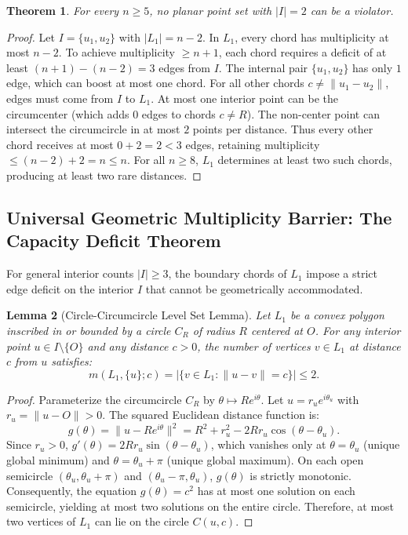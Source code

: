 \documentclass[11pt,reqno]{article}
\newtheorem{theorem}{Theorem}
\newtheorem{lemma}[theorem]{Lemma}
\theoremstyle{definition}
\begin{document}
\begin{theorem}\label{thm:two_interior}
For every $n \ge 5$, no planar point set with $|I| = 2$ can be a violator.
\end{theorem}
\begin{proof}
Let $I = \{u_1, u_2\}$ with $|L_1| = n - 2$. In $L_1$, every chord has multiplicity at most $n - 2$. To achieve multiplicity $\ge n + 1$, each chord requires a deficit of at least $(n + 1) - (n - 2) = 3$ edges from $I$.
The internal pair $\{u_1, u_2\}$ has only $1$ edge, which can boost at most one chord. For all other chords $c \neq \|u_1 - u_2\|$, edges must come from $I$ to $L_1$.
At most one interior point can be the circumcenter (which adds $0$ edges to chords $c \neq R$). The non-center point can intersect the circumcircle in at most $2$ points per distance. Thus every other chord receives at most $0 + 2 = 2 < 3$ edges, retaining multiplicity $\le (n-2) + 2 = n \le n$. For all $n \ge 8$, $L_1$ determines at least two such chords, producing at least two rare distances.
\end{proof}

\subsection{Universal Geometric Multiplicity Barrier: The Capacity Deficit Theorem}

For general interior counts $|I| \ge 3$, the boundary chords of $L_1$ impose a strict edge deficit on the interior $I$ that cannot be geometrically accommodated.

\begin{lemma}[Circle-Circumcircle Level Set Lemma]\label{lem:level_set}
Let $L_1$ be a convex polygon inscribed in or bounded by a circle $C_R$ of radius $R$ centered at $O$. For any interior point $u \in I \setminus \{O\}$ and any distance $c > 0$, the number of vertices $v \in L_1$ at distance $c$ from $u$ satisfies:
\[
m(L_1, \{u\}; c) = |\{v \in L_1 : \|u - v\| = c\}| \le 2.
\]
\end{lemma}
\begin{proof}
Parameterize the circumcircle $C_R$ by $\theta \mapsto R e^{i\theta}$. Let $u = r_u e^{i\theta_u}$ with $r_u = \|u - O\| > 0$. The squared Euclidean distance function is:
\[
g(\theta) = \|u - R e^{i\theta}\|^2 = R^2 + r_u^2 - 2 R r_u \cos(\theta - \theta_u).
\]
Since $r_u > 0$, $g'(\theta) = 2 R r_u \sin(\theta - \theta_u)$, which vanishes only at $\theta = \theta_u$ (unique global minimum) and $\theta = \theta_u + \pi$ (unique global maximum). On each open semicircle $(\theta_u, \theta_u + \pi)$ and $(\theta_u - \pi, \theta_u)$, $g(\theta)$ is strictly monotonic. Consequently, the equation $g(\theta) = c^2$ has at most one solution on each semicircle, yielding at most two solutions on the entire circle. Therefore, at most two vertices of $L_1$ can lie on the circle $C(u, c)$.
\end{proof}
\end{document}
